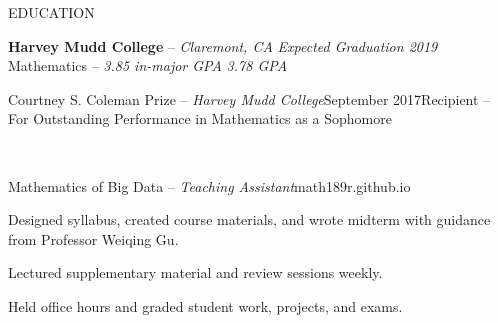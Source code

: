 \documentclass{resume} %
\begin{document}
\begin{rSection}{EDUCATION}

{{\bf Harvey Mudd College} -- {\it Claremont, CA}} \hfill {\em Expected Graduation 2019} \\ 
Mathematics -- {\em 3.85 in-major GPA} \hfill {\em 3.78 GPA}\\[-1.25em]

\begin{rSubsection}{Courtney S. Coleman Prize -- {\it Harvey Mudd College}}{September 2017}{Recipient -- For Outstanding Performance in Mathematics as a Sophomore}
\item\quad\\[-3.25em]
\end{rSubsection}

\begin{rSubsection}{Mathematics of Big Data -- {\it Teaching Assistant}}{\textsf{math189r.github.io}}{}

\item Designed syllabus, created course materials, and wrote midterm with guidance from Professor Weiqing Gu.
\item Lectured supplementary material and review sessions weekly.
\item Held office hours and graded student work, projects, and exams.
\end{rSubsection}
\end{rSection}
\end{document}
